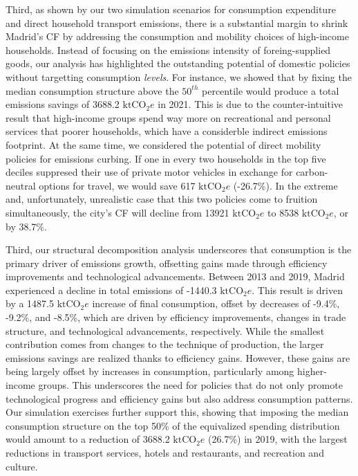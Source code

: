 \documentclass[
  10pt,
  twocolumn]{aft}
\begin{document}
Third, as shown by our two simulation scenarios for consumption
expenditure and direct household transport emissions, there is a
substantial margin to shrink Madrid's CF by addressing the consumption
and mobility choices of high-income households. Instead of focusing on
the emissions intensity of foreing-supplied goods, our analysis has
highlighted the outstanding potential of domestic policies without
targetting consumption \emph{levels}. For instance, we showed that by
fixing the median consumption structure above the \(50^{th}\) percentile
would produce a total emissions savings of 3688.2 \(\text{ktCO}_2e\) in
2021. This is due to the counter-intuitive result that high-income
groups spend way more on recreational and personal services that poorer
households, which have a considerble indirect emissions footprint. At
the same time, we considered the potential of direct mobility policies
for emissions curbing. If one in every two households in the top five
deciles suppresed their use of private motor vehicles in exchange for
carbon-neutral options for travel, we would save 617 \(\text{ktCO}_2e\)
(-26.7\%). In the extreme and, unfortunately, unrealistic case that this
two policies come to fruition simultaneously, the city's CF will decline
from 13921 \(\text{ktCO}_2e\) to 8538 \(\text{ktCO}_2e\), or by 38.7\%.

Third, our structural decomposition analysis underscores that
consumption is the primary driver of emissions growth, offsetting gains
made through efficiency improvements and technological advancements.
Between 2013 and 2019, Madrid experienced a decline in total emissions
of -1440.3 \(\text{ktCO}_2e\). This result is driven by a 1487.5
\(\text{ktCO}_2e\) increase of final consumption, offset by decreases of
-9.4\%, -9.2\%, and -8.5\%, which are driven by efficiency improvements,
changes in trade structure, and technological advancements,
respectively. While the smallest contribution comes from changes to the
technique of production, the larger emissions savings are realized
thanks to efficiency gains. However, these gains are being largely
offset by increases in consumption, particularly among higher-income
groups. This underscores the need for policies that do not only promote
technological progress and efficiency gains but also address consumption
patterns. Our simulation exercises further support this, showing that
imposing the median consumption structure on the top 50\% of the
equivalized spending distribution would amount to a reduction of 3688.2
\(\text{ktCO}_2e\) (26.7\%) in 2019, with the largest reductions in
transport services, hotels and restaurants, and recreation and culture.
\end{document}
